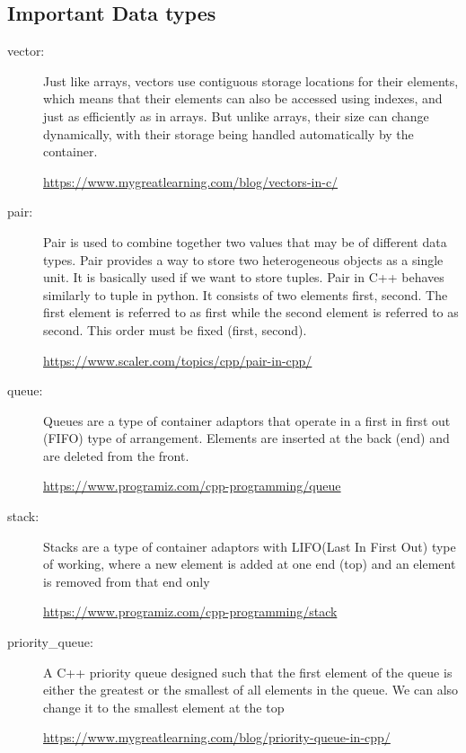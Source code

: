 \documentclass[12pt, a4paper]{article}
\begin{document}
\subsection{Important Data types}
\begin{description}
\item[vector:] Just like arrays, vectors use contiguous storage locations for their elements, which means that their elements can also be accessed using indexes, and just as efficiently as in arrays. But unlike arrays, their size can change dynamically, with their storage being handled automatically by the container.

\url{https://www.mygreatlearning.com/blog/vectors-in-c/}
\item[pair:] Pair is used to combine together two values that may be of different data types. Pair provides a way to store two heterogeneous objects as a single unit. It is basically used if we want to store tuples. Pair in C++ behaves similarly to tuple in python. It consists of two elements {first, second}. The first element is referred to as first while the second element is referred to as second. This order must be fixed (first, second).

\url{https://www.scaler.com/topics/cpp/pair-in-cpp/}
\item[queue:] Queues are a type of container adaptors that operate in a first in first out (FIFO) type of arrangement. Elements are inserted at the back (end) and are deleted from the front.

\url{https://www.programiz.com/cpp-programming/queue}
\item[stack:] Stacks are a type of container adaptors with LIFO(Last In First Out) type of working, where a new element is added at one end (top) and an element is removed from that end only

\url{https://www.programiz.com/cpp-programming/stack}
\item[priority\_queue:] A C++ priority queue designed such that the first element of the queue is either the greatest or the smallest of all elements in the queue. We can also change it to the smallest element at the top

\url{https://www.mygreatlearning.com/blog/priority-queue-in-cpp/}
\end{description}
\end{document}

